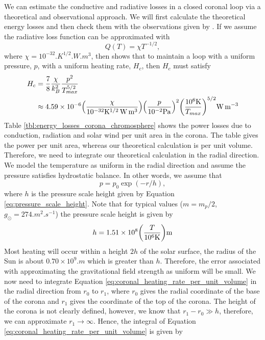 We can estimate the conductive and radiative losses in a closed coronal loop via a theoretical and observational approach. We will first calculate the theoretical energy losses and then check them with the observations given by \citet{Withbroe1977}. If we assume the radiative loss function can be approximated with
\begin{equation}
    Q(T) = \chi T^{-1/2},
\end{equation}
where $\chi=10^{-32}\si{.K^{1/2}.W.m^3}$, then \citet{Priest2014} shows that to maintain a loop with a uniform pressure, $p$, with a uniform heating rate, $H_c$, then $H_c$ must satisfy
\begin{equation}
    \label{eq:coronal_heating_rate_per_unit_volume}
    \begin{aligned}
    H_c &= \frac{7}{8}\frac{\chi}{k_B^2}\frac{p^2}{T_{max}^{5/2}} \\
    &\approx 4.59\times10^{-6}\qty(\frac{\chi}{10^{-32}\si{.K^{1/2}.W.m^3}})\qty(\frac{p}{10^{-2}\si{.Pa}})^2\qty(\frac{10^6\si{.K}}{T_{max}})^{5/2}\si{.W.m^{-3}}
    \end{aligned}
\end{equation}
Table \ref{tbl:energy_losses_corona_chromosphere} shows the power losses due to conduction, radiation and solar wind per unit area in the corona. The table gives the power per unit area, whereas our theoretical calculation is per unit volume. Therefore, we need to integrate our theoretical calculation in the radial direction. We model the temperature as uniform in the radial direction and assume the pressure satisfies hydrostatic balance. In other words, we assume that
\begin{equation}
    p=p_0\exp(-r/h),
\end{equation}
where $h$ is the pressure scale height given by Equation \eqref{eq:pressure_scale_height}. Note that for typical values ($m=m_p/2$, $g_{\odot}=274\si{.m^2.s^{-1}}$) the pressure scale height is given by
\begin{equation}
    h = 1.51\times10^8\qty(\frac{T}{10^6\si{.K}})\si{.m}
\end{equation}
Most heating will occur within a height $2h$ of the solar surface, the radius of the Sun is about $0.70\times10^9\si{.m}$ \citep{sun_vital_statistics} which is greater than $h$. Therefore, the error associated with approximating the gravitational field strength as uniform will be small. 
We now need to integrate Equation \eqref{eq:coronal_heating_rate_per_unit_volume} in the radial direction from $r_0$ to $r_1$, where $r_0$ gives the radial coordinate of the base of the corona and $r_1$ gives the coordinate of the top of the corona. The height of the corona is not clearly defined, however, we know that $r_1-r_0\gg h$, therefore, we can approximate $r_1\rightarrow \infty$. Hence, the integral of Equation \eqref{eq:coronal_heating_rate_per_unit_volume} is given by
